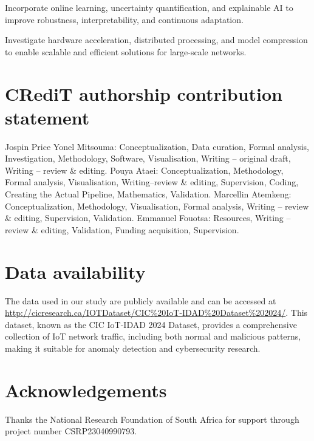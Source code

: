 \documentclass[preprint,12pt,authoryear]{elsarticle}
\begin{document}
\noindent Incorporate online learning, uncertainty quantification, and explainable AI to improve robustness, interpretability, and continuous adaptation.
    
\noindent Investigate hardware acceleration, distributed processing, and model compression to enable scalable and efficient solutions for large-scale networks.

\section{CRediT authorship contribution statement}

\noindent Jospin Price Yonel Mitsouma: Conceptualization, Data curation, Formal analysis, Investigation, Methodology, Software, Visualisation, Writing – original draft, Writing – review \& editing. Pouya Ataei: Conceptualization, Methodology, Formal analysis, Visualisation, Writing–review \& editing, Supervision, Coding, Creating the Actual Pipeline, Mathematics, Validation. Marcellin Atemkeng: Conceptualization, Methodology, Visualisation, Formal analysis, Writing – review \& editing, Supervision, Validation.  Emmanuel Fouotsa: Resources, Writing – review \& editing, Validation, Funding acquisition, Supervision.

\section{Data availability}
\noindent The data used in our study are publicly available and can be accessed at \url{http://cicresearch.ca/IOTDataset/CIC%20IoT-IDAD%20Dataset%202024/}. This dataset, known as the CIC IoT-IDAD 2024 Dataset, provides a comprehensive collection of IoT network traffic, including both normal and malicious patterns, making it suitable for anomaly detection and cybersecurity research.



\section{Acknowledgements}
\noindent Thanks the National Research Foundation of South Africa for support through project number CSRP23040990793.



\end{document}
